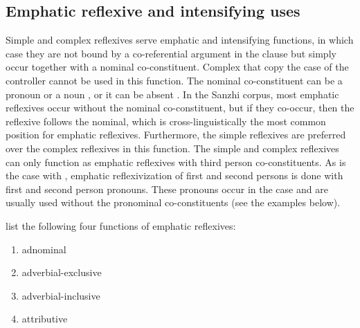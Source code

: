 
\subsection{Emphatic reflexive and intensifying uses}
\label{ssec:Emphatic reflexive use}

Simple and complex  reflexives serve emphatic and intensifying functions, in which case they are not bound by a co-referential argument in the clause but simply occur together with a nominal co-constituent. Complex  that copy the case of the controller cannot be used in this function. The nominal co-constituent can be a pronoun  or a noun , or it can be absent . In the Sanzhi corpus, most emphatic reflexives occur without the nominal co-constituent, but if they co-occur, then the reflexive follows the nominal, which is cross-linguistically the most common position for emphatic reflexives. Furthermore, the simple reflexives are preferred over the complex reflexives in this function. The simple and complex  reflexives can only function as emphatic reflexives with third person co-constituents. As is the case with , emphatic reflexivization of first and second persons is done with first and second person pronouns. These pronouns occur in the  case and are usually used without the pronominal co-constituents (see the examples below).

\citet{König.Gast2006} list the following four functions of emphatic reflexives:
%
\begin{enumerate}
	\item	adnominal 
	\item	adverbial-exclusive  
	\item	adverbial-inclusive  
	\item	attributive 
\end{enumerate}

